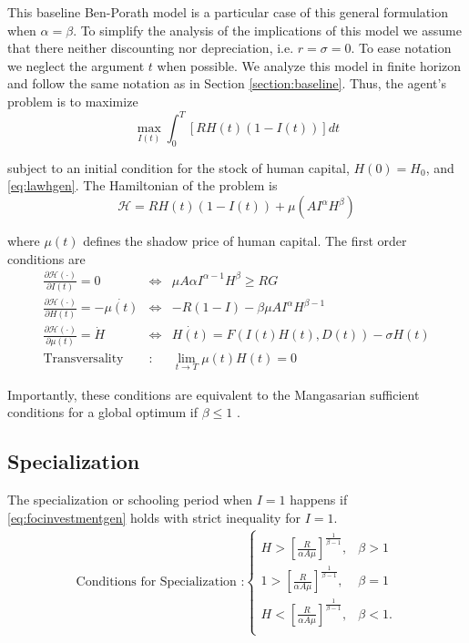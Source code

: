 \indent This baseline Ben-Porath model is a particular case of this general formulation when $\alpha = \beta$. To simplify the analysis of the implications of this model we assume that there neither discounting nor depreciation, i.e. $r = \sigma = 0$. To ease notation we neglect the argument $t$ when possible. We analyze this model in finite horizon and follow the same notation as in Section \ref{section:baseline}. Thus, the agent's problem is to maximize
\begin{equation}
\max_{I(t)} \int _{0} ^{T} \left[ RH(t) \left(1 - I(t) \right) \right]dt
\end{equation}

\noindent subject to an initial condition for the stock of human capital, $H(0) = H_{0}$, and \eqref{eq:lawhgen}. The Hamiltonian of the problem is
\begin{equation}
\mathcal{H} = RH(t) \left(1 - I(t) \right) + \mu \left( A I^{\alpha} H^{\beta} \right)
\end{equation} 

where $\mu(t)$ defines the shadow price of human capital. The first order conditions are
\begin{eqnarray}
\frac{\partial \mathcal{H} (\cdot)}{\partial I(t)} = 0 &\Leftrightarrow& \mu A \alpha I^{\alpha - 1} H^{\beta} \geq RG \label{eq:focinvestmentgen} \\
\frac{\partial \mathcal{H} (\cdot)}{\partial H(t)} = - \dot{\mu(t)} &\Leftrightarrow& -R(1 - I) - \beta \mu A I^{\alpha} H^{\beta -1} \label{eq:focstockgen} \\ 
\frac{\partial \mathcal{H} (\cdot)}{\partial \mu(t)} = \dot{H} &\Leftrightarrow& \dot{H(t)} = F \left( I(t) H(t), D(t) \right) - \sigma H(t) \label{eq:focmotiongen} \\
\text{Transversality} &:& \lim_{t \rightarrow T} \mu(t) H(t) = 0 \label{eq:foctransversalitygen}
\end{eqnarray}

Importantly, these conditions are equivalent to the Mangasarian sufficient conditions for a global optimum if $\beta \leq 1$ \citep[see][]{mangasarian1966sufficient}.

\subsection{Specialization}
The specialization or schooling period when $I = 1$ happens if
\eqref{eq:focinvestmentgen} holds with strict inequality for $I=1$.
\begin{eqnarray}
\text{Conditions for Specialization :}
\begin{cases}
H > \left[ \frac{R}{\alpha A \mu} \right]^{\frac{1}{\beta - 1}}, & \beta > 1 \\
1 > \left[ \frac{R}{\alpha A \mu} \right]^{\frac{1}{\beta - 1}}, & \beta = 1 \\
H < \left[ \frac{R}{\alpha A \mu} \right]^{\frac{1}{\beta - 1}}, & \beta < 1. \\
\end{cases}
\end{eqnarray}

